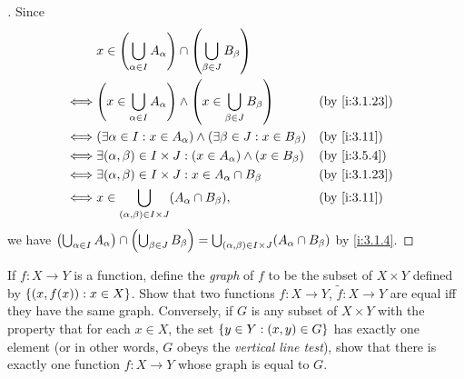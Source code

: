 \begin{proof}[]
  Since
  \begin{align*}
         & x \in \pa{\bigcup_{\alpha \in I} A_\alpha} \cap \pa{\bigcup_{\beta \in J} B_\beta}                           \\
    \iff & \pa{x \in \bigcup_{\alpha \in I} A_\alpha} \land \pa{x \in \bigcup_{\beta \in J} B_\beta} &  & \by{i:3.1.23} \\
    \iff & \pa{\exists \alpha \in I : x \in A_\alpha} \land \pa{\exists \beta \in J : x \in B_\beta} &  & \by{i:3.11}   \\
    \iff & \exists (\alpha, \beta) \in I \times J : (x \in A_\alpha) \land (x \in B_\beta)           &  & \by{i:3.5.4}  \\
    \iff & \exists (\alpha, \beta) \in I \times J : x \in A_\alpha \cap B_\beta                      &  & \by{i:3.1.23} \\
    \iff & x \in \bigcup_{(\alpha, \beta) \in I \times J} (A_\alpha \cap B_\beta),                   &  & \by{i:3.11}
  \end{align*}
  we have \(\left\lparen\bigcup_{\alpha \in I} A_\alpha\right\rparen \cap \left\lparen\bigcup_{\beta \in J} B_\beta\right\rparen = \bigcup_{(\alpha, \beta) \in I \times J} (A_\alpha \cap B_\beta)\) by \cref{i:3.1.4}.
\end{proof}

\begin{ex}\label{i:ex:3.5.10}
  If \(f : X \to Y\) is a function, define the \emph{graph} of \(f\) to be the subset of \(X \times Y\) defined by \(\left\lbrace(x, f(x)) : x \in X\right\rbrace\).
  Show that two functions \(f : X \to Y\), \(\tilde{f} : X \to Y\) are equal iff they have the same graph.
  Conversely, if \(G\) is any subset of \(X \times Y\) with the property that for each \(x \in X\), the set \(\left\lbrace y \in Y : (x, y) \in G\right\rbrace\) has exactly one element (or in other words, \(G\) obeys the \emph{vertical line test}), show that there is exactly one function \(f : X \to Y\) whose graph is equal to \(G\).
\end{ex}

